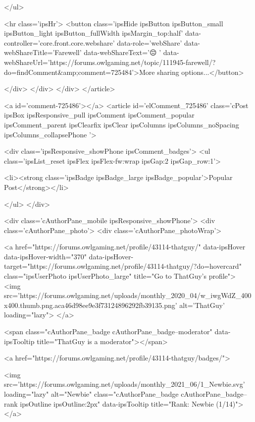 	</ul>


	<hr class='ipsHr'>
	<button class='ipsHide ipsButton ipsButton_small ipsButton_light ipsButton_fullWidth ipsMargin_top:half' data-controller='core.front.core.webshare' data-role='webShare' data-webShareTitle='Farewell' data-webShareText='😔 
' data-webShareUrl='https://forums.owlgaming.net/topic/111945-farewell/?do=findComment&amp;comment=725484'>More sharing options...</button>

	
</div>
</div>
	</div>
</article>
					
				
					
					
					



<a id='comment-725486'></a>
<article  id='elComment_725486' class='cPost ipsBox ipsResponsive_pull  ipsComment ipsComment_popular ipsComment_parent ipsClearfix ipsClear ipsColumns ipsColumns_noSpacing ipsColumns_collapsePhone    '>
	

	
		<div class='ipsResponsive_showPhone ipsComment_badges'>
			<ul class='ipsList_reset ipsFlex ipsFlex-fw:wrap ipsGap:2 ipsGap_row:1'>
				
				
				
				
					<li><strong class='ipsBadge ipsBadge_large ipsBadge_popular'>Popular Post</strong></li>
				
			</ul>
		</div>
	

	<div class='cAuthorPane_mobile ipsResponsive_showPhone'>
		<div class='cAuthorPane_photo'>
			<div class='cAuthorPane_photoWrap'>
				


	<a href="https://forums.owlgaming.net/profile/43114-thatguy/" data-ipsHover data-ipsHover-width="370" data-ipsHover-target="https://forums.owlgaming.net/profile/43114-thatguy/?do=hovercard" class="ipsUserPhoto ipsUserPhoto_large" title="Go to ThatGuy's profile">
		<img src='https://forums.owlgaming.net/uploads/monthly_2020_04/w_iwgWdZ_400x400.thumb.png.aca46d98ee9e3f73124896292fb39135.png' alt='ThatGuy' loading="lazy">
	</a>

				
				<span class="cAuthorPane_badge cAuthorPane_badge--moderator" data-ipsTooltip title="ThatGuy is a moderator"></span>
				
				
					<a href="https://forums.owlgaming.net/profile/43114-thatguy/badges/">
						
<img src='https://forums.owlgaming.net/uploads/monthly_2021_06/1_Newbie.svg' loading="lazy" alt="Newbie" class="cAuthorPane_badge cAuthorPane_badge--rank ipsOutline ipsOutline:2px" data-ipsTooltip title="Rank: Newbie (1/14)">
					</a>
				
